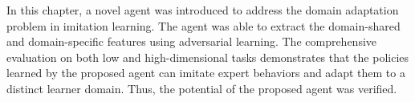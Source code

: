 In this chapter,
a novel \DAIL{} agent was introduced to address the domain adaptation problem in imitation learning.
The agent was able to extract the domain-shared and domain-specific features using adversarial learning.
The comprehensive evaluation on both low and high-dimensional tasks demonstrates that the policies learned by the proposed agent can imitate expert behaviors and adapt them to a distinct learner domain.
Thus, the potential of the proposed agent was verified.
